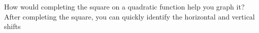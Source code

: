 {How would completing the square on a quadratic function help you graph it?}
{After completing the square, you can quickly identify the horizontal and vertical shifts}
